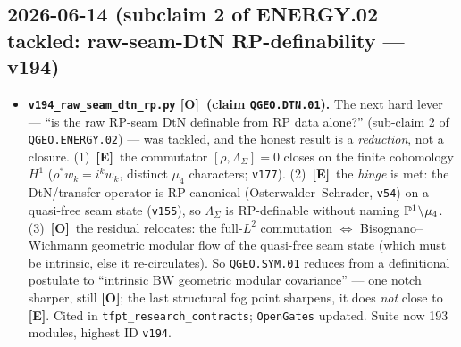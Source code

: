 \documentclass[11pt]{article}
\providecommand{\mE}{\textbf{[E]}}\providecommand{\mC}{\textbf{[C]}}
\providecommand{\mO}{\textbf{[O]}}\providecommand{\mX}{\textbf{[X]}}
\providecommand{\vref}[1]{\texttt{#1}}
\begin{document}
\subsection*{2026-06-14 (subclaim 2 of ENERGY.02 tackled: raw-seam-DtN RP-definability --- v194)}
\begin{itemize}
\item \textbf{\texttt{v194\_raw\_seam\_dtn\_rp.py} \mO\ (claim \texttt{QGEO.DTN.01}).} The next hard lever ---
  ``is the raw RP-seam DtN definable from RP data alone?'' (sub-claim 2 of \texttt{QGEO.ENERGY.02}) --- was
  tackled, and the honest result is a \emph{reduction}, not a closure. (1)~\mE\ the commutator
  $[\rho,\Lambda_\Sigma]=0$ closes on the finite cohomology $H^1$ ($\rho^*w_k=i^k w_k$, distinct $\mu_4$
  characters; \vref{v177}). (2)~\mE\ the \emph{hinge} is met: the DtN/transfer operator is RP-canonical
  (Osterwalder--Schrader, \vref{v54}) on a quasi-free seam state (\vref{v155}), so $\Lambda_\Sigma$ is
  RP-definable without naming $\mathbb{P}^1\!\setminus\!\mu_4$. (3)~\mO\ the residual relocates: the full-$L^2$
  commutation $\Leftrightarrow$ Bisognano--Wichmann geometric modular flow of the quasi-free seam state
  (which must be intrinsic, else it re-circulates). So \texttt{QGEO.SYM.01} reduces from a definitional
  postulate to ``intrinsic BW geometric modular covariance'' --- one notch sharper, still \mO; the last
  structural fog point sharpens, it does \emph{not} close to \mE. Cited in
  \texttt{tfpt\_research\_contracts}; \texttt{OpenGates} updated. Suite now 193 modules, highest ID
  \texttt{v194}.
\end{itemize}
\end{document}
